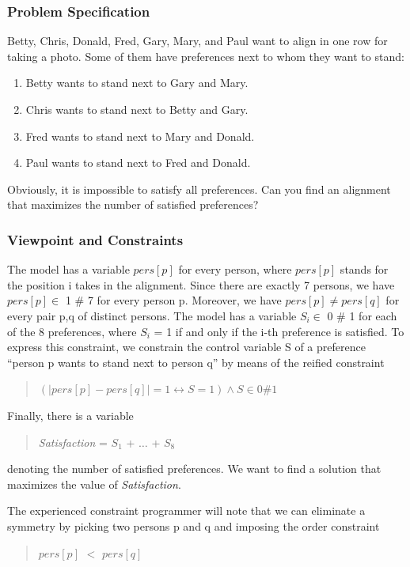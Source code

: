 \documentclass[a4paper,halfparskip]{scrartcl}
\begin{document}
\subsubsection{Problem Specification}
Betty, Chris, Donald, Fred, Gary, Mary, and Paul want to align in one 
row for taking a photo. Some of them have preferences next to whom they 
want to stand:
\begin{enumerate}
\item
Betty wants to stand next to Gary and Mary.
\item
Chris wants to stand next to Betty and Gary.
\item   
Fred wants to stand next to Mary and Donald.
\item
Paul wants to stand next to Fred and Donald.
\end{enumerate}
Obviously, it is impossible to satisfy all preferences. Can you find 
an alignment that maximizes the number of satisfied preferences?

\subsubsection{Viewpoint and Constraints}
The model has a variable $ pers[p] $ for every person, where $ pers[p]$ stands 
for the position i takes in the alignment. Since there are exactly 7 
persons, we have $ pers[p] \in $ 1 $\#$ 7 for every person p. Moreover, we 
have $pers[p] \neq pers[q] $ for every pair p,q of distinct persons. The model 
has a variable $ S_i \in$ 0 $\# $ 1 for each of the 8 preferences, where 
$S_i$ = 1 if and only if the i-th preference is satisfied. To express 
this constraint, we constrain the control variable S of a preference 
``person p wants to stand next to person q'' by means of the reified 
constraint
\begin{quote}
    $(|pers[p] - pers[q]| = 1 \leftrightarrow  S = 1) \land  S \in 0\# 1$
\end{quote}
Finally, there is a variable
\begin{quote}
    \emph{Satisfaction} = $S_1 $ + $\ldots$ + $S_8$
\end{quote}
denoting the number of satisfied preferences. We want to find a solution 
that maximizes the value of \emph{Satisfaction}.

The experienced constraint programmer will note that we can eliminate a 
symmetry by picking two persons p and q and imposing the order constraint 
\begin{quote}
 $pers[p]$ $ <  $ $pers[q] $
\end{quote}
\end{document}
